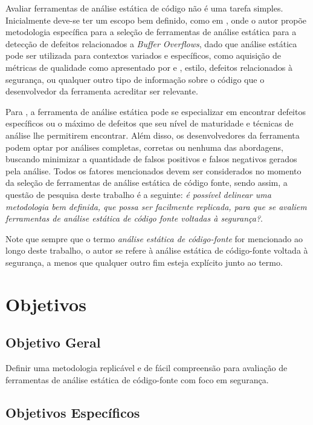 Avaliar ferramentas de análise estática de código não é uma tarefa simples.
Inicialmente deve-se ter um escopo bem definido, como em \cite{harvard}, onde o autor propõe metodologia específica para a seleção de ferramentas de análise estática para a detecção de defeitos relacionados a \textit{Buffer Overflows}, dado que análise estática pode ser utilizada para contextos variados e específicos, como aquisição de métricas de qualidade como apresentado por \cite{meirelles2013} e \cite{analizoartigo}, estilo, defeitos relacionados à segurança, ou qualquer outro tipo de informação sobre o código que o desenvolvedor da ferramenta acreditar ser relevante.

Para \cite{secure_programming}, a ferramenta de análise estática pode se especializar em encontrar defeitos específicos ou o máximo de defeitos que seu nível de maturidade e técnicas de análise lhe permitirem encontrar. Além disso, os desenvolvedores da ferramenta podem optar por análises completas, corretas ou nenhuma das abordagens, buscando minimizar a quantidade de falsos positivos e falsos negativos gerados pela análise. Todos os fatores mencionados devem ser considerados no momento da seleção de ferramentas de análise estática de código fonte, sendo assim, a questão de pesquisa deste trabalho é a seguinte: \textit{é possível delinear uma metodologia bem definida, que possa ser facilmente replicada, para que se avaliem ferramentas de análise estática de código fonte voltadas à segurança?}.

Note que sempre que o termo \textit{análise estática de código-fonte} for mencionado ao longo deste trabalho, o autor se refere à análise estática de código-fonte voltada à segurança, a menos que qualquer outro fim esteja explícito junto ao termo.

\section*{Objetivos}
\subsection*{Objetivo Geral}

Definir uma metodologia replicável e de fácil compreensão para avaliação de ferramentas de análise estática de código-fonte com foco em segurança.

\subsection*{Objetivos Específicos}

